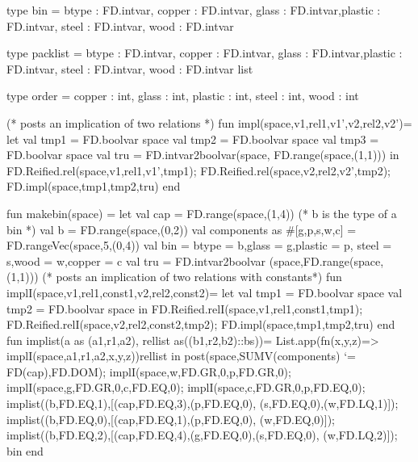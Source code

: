 \documentclass[a4paper,halfparskip]{scrartcl}
\begin{document}
\begin{myverbatim}
type bin = {btype : FD.intvar, copper : FD.intvar, 
            glass : FD.intvar,plastic : FD.intvar,
            steel : FD.intvar, wood : FD.intvar}
                  
type packlist = 
           {btype : FD.intvar, copper : FD.intvar, 
            glass : FD.intvar,plastic : FD.intvar, 
            steel : FD.intvar, wood : FD.intvar} list
       
type order = 
           {copper : int, glass : int, plastic : int,
            steel : int, wood : int}                  

                       
(* posts an implication of two relations *)  
fun impl(space,v1,rel1,v1',v2,rel2,v2')= 
    let
        val tmp1 = FD.boolvar space
        val tmp2 = FD.boolvar space
        val tmp3 = FD.boolvar space
        val tru = FD.intvar2boolvar(space,
                     FD.range(space,(1,1)))
    in
        FD.Reified.rel(space,v1,rel1,v1',tmp1);
        FD.Reified.rel(space,v2,rel2,v2',tmp2);
        FD.impl(space,tmp1,tmp2,tru)
    end
                       
                           
fun makebin(space) =
    let 
        val cap = FD.range(space,(1,4))
       (* b is the type of a bin *)
        val b = FD.range(space,(0,2))
        val components as #[g,p,s,w,c] = 
                       FD.rangeVec(space,5,(0,4))
        val bin = {btype = b,glass = g,plastic = p,
                   steel = s,wood = w,copper = c}
        val tru = FD.intvar2boolvar
                  (space,FD.range(space,(1,1)))
       (* posts an implication of two relations with 
          constants*) 
        fun implI(space,v1,rel1,const1,v2,rel2,const2)= 
            let
                val tmp1 = FD.boolvar space
                val tmp2 = FD.boolvar space
            in
                FD.Reified.relI(space,v1,rel1,const1,tmp1);
                FD.Reified.relI(space,v2,rel2,const2,tmp2);
                FD.impl(space,tmp1,tmp2,tru)
            end
        fun implist(a as (a1,r1,a2),
                    rellist as((b1,r2,b2)::bs))=
                List.app(fn(x,y,z)=> 
                      implI(space,a1,r1,a2,x,y,z))rellist
    in
       post(space,SUMV(components) `= FD(cap),FD.DOM);
       implI(space,w,FD.GR,0,p,FD.GR,0);
       implI(space,g,FD.GR,0,c,FD.EQ,0);
       implI(space,c,FD.GR,0,p,FD.EQ,0);
       implist((b,FD.EQ,1),[(cap,FD.EQ,3),(p,FD.EQ,0),
               (s,FD.EQ,0),(w,FD.LQ,1)]);
       implist((b,FD.EQ,0),[(cap,FD.EQ,1),(p,FD.EQ,0),
               (w,FD.EQ,0)]);
       implist((b,FD.EQ,2),[(cap,FD.EQ,4),(g,FD.EQ,0),(s,FD.EQ,0),
               (w,FD.LQ,2)]);
       bin        
    end    




\end{myverbatim}
\end{document}
